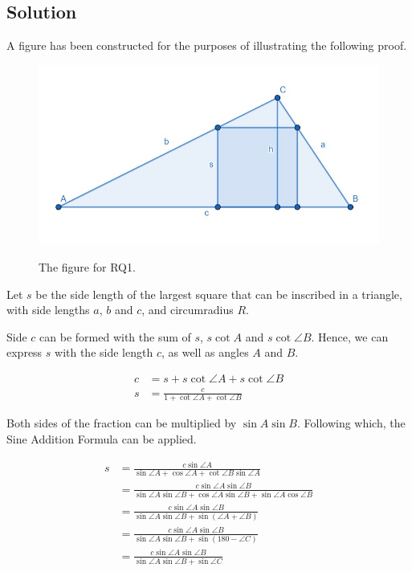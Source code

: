 \documentclass[12pt]{scrartcl}
\begin{document}
\subsection{Solution}
A figure has been constructed for the purposes of illustrating the following proof.
\begin{figure}[htpb]
	\centering
	\includegraphics[scale=.75]{images/rq1.jpg}
	\label{fig:rq1_img}
	\caption{The figure for RQ1.}
\end{figure}

Let $s$ be the side length of the largest square that can be inscribed in a triangle,
with side lengths $a$, $b$ and $c$, and circumradius $R$.

Side $c$ can be formed with the sum of $s$, $s \cot A$ and $s \cot \angle{B}$.
Hence, we can express $s$ with the side length $c$, as well as angles $A$ and $B$.

\begin{align*}
	c & = s+s\cot \angle{A}+s\cot \angle{B}         \\
	s & = \frac{c}{1+\cot \angle{A}+\cot \angle{B}}
\end{align*}

Both sides of the fraction can be multiplied by $\sin A \sin B$. Following which, the
Sine Addition Formula can be applied.

\begin{align*}
	s & = \frac{c \sin\angle{A}}{\sin\angle{A}+\cos\angle{A}+\cot\angle{B}\sin\angle{A}}                                       \\
	  & = \frac{c\sin\angle{A}\sin\angle{B}}{\sin\angle{A}\sin\angle{B}+\cos\angle{A}\sin\angle{B}+\sin\angle{A}\cos\angle{B}} \\
	  & = \frac{c\sin\angle{A}\sin\angle{B}}{\sin\angle{A}\sin\angle{B}+\sin\left(\angle{A}+\angle{B}\right)}                  \\
	  & = \frac{c\sin\angle{A}\sin\angle{B}}{\sin\angle{A}\sin\angle{B}+\sin\left(180-\angle C\right)}                         \\
	  & = \frac{c\sin\angle{A}\sin\angle{B}}{\sin\angle{A}\sin\angle{B}+\sin \angle C}
\end{align*}
\end{document}
